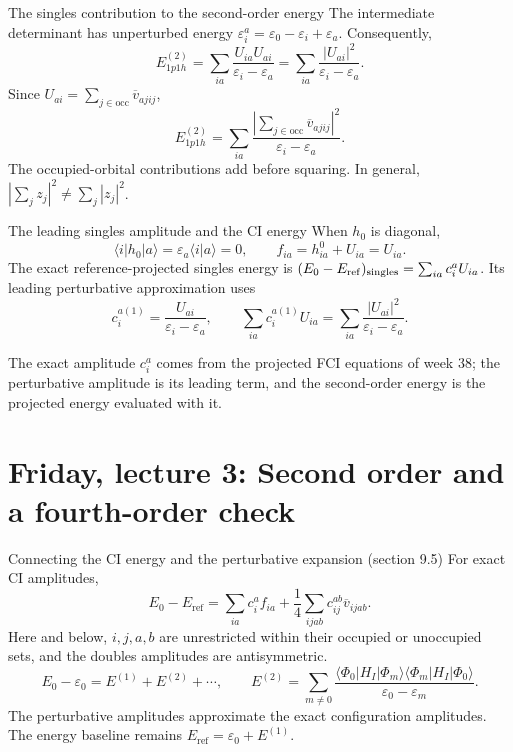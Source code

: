 \documentclass[aspectratio=169,10pt]{beamer}
\newcommand{\mbbox}[1]{%
  \begin{tcolorbox}[colback=paleblue,colframe=uioblue,title={\bfseries Many-body connection}]
  #1
  \end{tcolorbox}}
\newcommand{\braket}[2]{\langle #1\vert #2\rangle}
\newcommand{\mel}[3]{\langle #1\lvert #2\rvert #3\rangle}
\newcommand{\vbar}[4]{\overline v_{#1#2#3#4}}
\newcommand{\Eref}{E_{\mathrm{ref}}}
\newcommand{\ph}{\Phi_0}
\begin{document}
\begin{frame}{The singles contribution to the second-order energy}
The intermediate determinant has unperturbed energy
\(\varepsilon_i^a=\varepsilon_0-\varepsilon_i+\varepsilon_a\). Consequently,
\[
\boxed{E^{(2)}_{1p1h}=
\sum_{ia}\frac{U_{ia}U_{ai}}{\varepsilon_i-\varepsilon_a}
=\sum_{ia}\frac{|U_{ai}|^2}{\varepsilon_i-\varepsilon_a}.}
\]
Since \(U_{ai}=\sum_{j\in\mathrm{occ}}\vbar{a}{j}{i}{j}\),
\[
E^{(2)}_{1p1h}=
\sum_{ia}\frac{\left|\sum_{j\in\mathrm{occ}}\vbar{a}{j}{i}{j}\right|^2}
 {\varepsilon_i-\varepsilon_a}.
\]
\small The occupied-orbital contributions add before squaring. In general, \(\left|\sum_j z_j\right|^2\ne\sum_j|z_j|^2\).
\end{frame}

\begin{frame}{The leading singles amplitude and the CI energy}
When \(h_0\) is diagonal,
\[
\langle i\lvert h_0\rvert a\rangle=\varepsilon_a\braket{i}{a}=0,
\qquad f_{ia}=h^0_{ia}+U_{ia}=U_{ia}.
\]
The exact reference-projected singles energy is
\((E_0-\Eref)_{\rm singles}=\sum_{ia}c_i^a U_{ia}\).
Its leading perturbative approximation uses
\[
\boxed{c_i^{a(1)}=\frac{U_{ai}}{\varepsilon_i-\varepsilon_a},}
\qquad
\sum_{ia}c_i^{a(1)}U_{ia}
=\sum_{ia}\frac{|U_{ai}|^2}{\varepsilon_i-\varepsilon_a}.
\]
\mbbox{The exact amplitude \(c_i^a\) comes from the projected FCI equations of week 38; the perturbative amplitude is its leading term, and the second-order energy is the projected energy evaluated with it.}
\end{frame}

\section{Friday, lecture 3: Second order and a fourth-order check}

\begin{frame}{Connecting the CI energy and the perturbative expansion (section 9.5)}
For exact CI amplitudes,
\[
E_0-\Eref=\sum_{ia}c_i^a f_{ia}
+\frac14\sum_{ijab}c_{ij}^{ab}\vbar{i}{j}{a}{b}.
\]
Here and below, \(i,j,a,b\) are unrestricted within their occupied or unoccupied sets, and the doubles amplitudes are antisymmetric.
\[
E_0-\varepsilon_0=E^{(1)}+E^{(2)}+\cdots,
\qquad
E^{(2)}=\sum_{m\ne0}
\frac{\mel{\ph}{H_I}{\Phi_m}\mel{\Phi_m}{H_I}{\ph}}
 {\varepsilon_0-\varepsilon_m}.
\]
\small The perturbative amplitudes approximate the exact configuration amplitudes. The energy baseline remains \(\Eref=\varepsilon_0+E^{(1)}\).
\end{frame}
\end{document}
